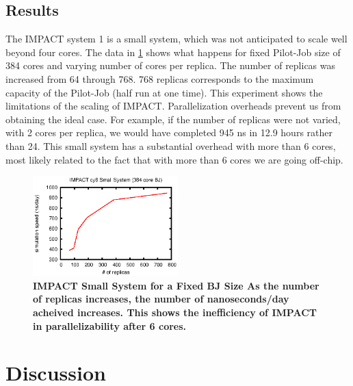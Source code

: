 \documentclass{sig-alternate}
\begin{document}

\subsection{Results}

The IMPACT system 1 is a small system, which was not anticipated to scale well beyond four cores. The data in \ref{fig:impact_cy8} shows what happens for fixed Pilot-Job size of 384 cores and varying number of cores per replica. The number of replicas was increased from 64 through 768. 768 replicas corresponds to the maximum capacity of the Pilot-Job (half run at one time). This experiment shows the limitations of the scaling of IMPACT. Parallelization overheads prevent us from obtaining the ideal case. For example, if the number of replicas were not varied, with 2 cores per replica, we would have completed 945 ns in 12.9 hours rather than 24. This small system has a substantial overhead with more than 6 cores, most likely related to the fact that with more than 6 cores we are going off-chip. 

\begin{figure}[t]
	\centering
		\includegraphics[width=0.5\textwidth]{impact_data/impact_cy8.eps}
	\caption{\textbf{IMPACT Small System for a Fixed BJ Size As the number of replicas  
                      increases, the number of nanoseconds/day acheived increases. This shows the inefficiency of IMPACT in parallelizability after 6 cores.}}
	\label{fig:impact_cy8}
\end{figure}


\section{Discussion}
\end{document}
